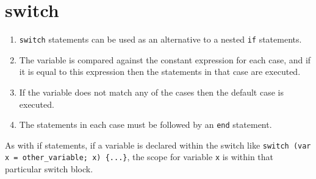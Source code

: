 \section{switch}

\begin{enumerate}
\begin{lstlisting}[numbers=none]
switch (variable) {
	case (constant expression): 
		statements
	end;
	case (constant expression): 
		statements
	end;
	case (constant expression): 
		statements
	end;
	default: statements
}
\end{lstlisting}
	\item \lstinline|switch| statements can be used as an alternative to a nested \lstinline|if| statements.
	\item The variable is compared against the constant expression for each case, and if it is equal to this expression then the statements in that case are executed.
	\item If the variable does not match any of the cases then the default case is executed.
	\item The statements in each case must be followed by an \lstinline|end| statement.
\end{enumerate}




As with if statements, if a variable is declared within the switch like \lstinline|switch (var x = other_variable; x) {...}|, the scope for variable \texttt{x} is within that particular switch block.